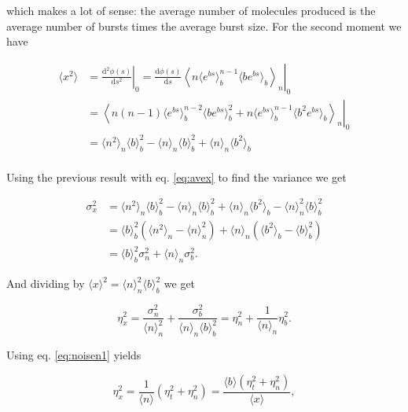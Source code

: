 which makes a lot of sense: the average number of molecules produced is the average number of bursts times the average burst size. For the second moment we have

\begin{equation}
  \begin{split}
    \langle x^2\rangle &= \left.\frac{\mathrm{d^2}\phi(s)}{\mathrm{d}s^2}\right|_0 = \left.\frac{\mathrm{d}\phi(s)}{\mathrm{d}s}\left\langle n\langle e^{bs}\rangle_b^{n-1}\langle b e^{bs}\rangle_b\right\rangle_n\right|_0\\
  &= \left.\left\langle n(n-1)\langle e^{bs}\rangle^{n-2}_b\langle be^{bs}\rangle^2_b+n\langle e^{bs}\rangle^{n-1}_b\langle b^2e^{bs}\rangle_b\right\rangle_n\right|_0\\
  &=\langle n^2\rangle_n\langle b\rangle_b^2-\langle n\rangle_n\langle b\rangle_b^2+\langle n\rangle_n\langle b^2\rangle_b\\
  \end{split}
\end{equation}

Using the previous result with eq. \ref{eq:avex} to find the variance we get

\begin{equation}
  \begin{split}
    \sigma_x^2 &= \langle n^2\rangle_n\langle b\rangle_b^2-\langle n\rangle_n\langle b\rangle_b^2+\langle n\rangle_n\langle b^2\rangle_b - \langle n\rangle_n^2\langle b\rangle_b^2\\
    &=\langle b\rangle_b^2\left(\langle n^2\rangle_n-\langle n\rangle^2_n\right) + \langle n\rangle_n\left(\langle b^2\rangle_b-\langle b\rangle_b^2\right)\\
    &=\langle b\rangle_b^2\sigma_n^2 + \langle n\rangle_n\sigma_b^2.
  \end{split}
\end{equation}

And dividing by $\langle x\rangle^2=\langle n\rangle_n^2\langle b\rangle_b^2$ we get

\begin{equation*}
  \eta_x^2=\frac{\sigma_n^2}{\langle n\rangle_n^2} + \frac{\sigma_b^2}{\langle n\rangle_n\langle b\rangle_b^2} = \eta_n^2+\frac{1}{\langle n\rangle_n}\eta_b^2.
\end{equation*}

Using eq. \ref{eq:noisen1} yields

\begin{equation}
  \label{eq:noisex}
  \eta_x^2=\frac{1}{\langle n\rangle}\left(\eta_t^2+\eta_n^2\right)=\frac{\langle b\rangle\left(\eta_t^2+\eta_n^2\right)}{\langle x\rangle},
\end{equation}

